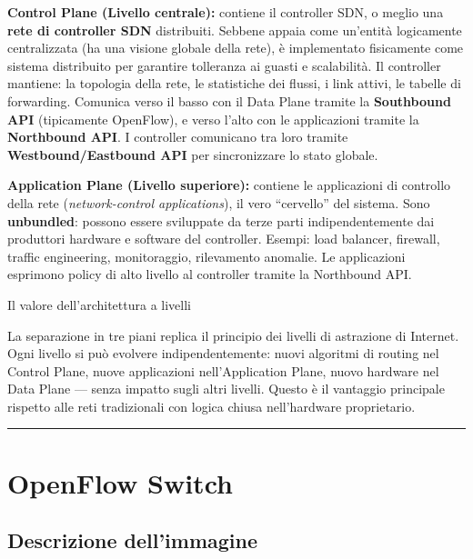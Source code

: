 \documentclass[
  italian,
  openany]{book}
\begin{document}
\textbf{Control Plane (Livello centrale):} contiene il controller SDN, o
meglio una \textbf{rete di controller SDN} distribuiti. Sebbene appaia
come un'entità logicamente centralizzata (ha una visione globale della
rete), è implementato fisicamente come sistema distribuito per garantire
tolleranza ai guasti e scalabilità. Il controller mantiene: la topologia
della rete, le statistiche dei flussi, i link attivi, le tabelle di
forwarding. Comunica verso il basso con il Data Plane tramite la
\textbf{Southbound API} (tipicamente OpenFlow), e verso l'alto con le
applicazioni tramite la \textbf{Northbound API}. I controller comunicano
tra loro tramite \textbf{Westbound/Eastbound API} per sincronizzare lo
stato globale.

\textbf{Application Plane (Livello superiore):} contiene le applicazioni
di controllo della rete (\emph{network-control applications}), il vero
``cervello'' del sistema. Sono \textbf{unbundled}: possono essere
sviluppate da terze parti indipendentemente dai produttori hardware e
software del controller. Esempi: load balancer, firewall, traffic
engineering, monitoraggio, rilevamento anomalie. Le applicazioni
esprimono policy di alto livello al controller tramite la Northbound
API.

\begin{calloutnote}{Il valore dell’architettura a livelli}

La separazione in tre piani replica il principio dei livelli di
astrazione di Internet. Ogni livello si può evolvere indipendentemente:
nuovi algoritmi di routing nel Control Plane, nuove applicazioni
nell'Application Plane, nuovo hardware nel Data Plane --- senza impatto
sugli altri livelli. Questo è il vantaggio principale rispetto alle reti
tradizionali con logica chiusa nell'hardware proprietario.

\end{calloutnote}

\begin{center}\rule{0.5\linewidth}{0.5pt}\end{center}

\section{OpenFlow Switch}\label{openflow-switch}

\subsection{Descrizione dell'immagine}\label{descrizione-dellimmagine-9}
\end{document}
